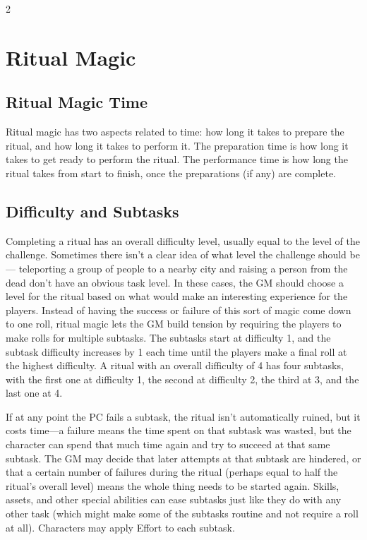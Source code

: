 \begin{multicols}{2}

\chapter{Ritual Magic}

\section{Ritual Magic Time}

Ritual magic has two aspects related to time: how long it takes to prepare the ritual, and how long it takes to perform it. The preparation time is how long it takes to get ready to perform the ritual. The performance time is how long the ritual takes from start to finish, once the preparations (if any) are complete. 

\section{Difficulty and Subtasks}

Completing a ritual has an overall difficulty level, usually equal to the level of the challenge. Sometimes there isn’t a clear idea of what level the challenge should be— teleporting a group of people to a nearby city and raising a person from the dead don’t have an obvious task level. In these cases, the GM should choose a level for the ritual based on what would make an interesting experience for the players. Instead of having the success or failure of this sort of magic come down to one roll, ritual magic lets the GM build tension by requiring the players to make rolls for multiple subtasks. The subtasks start at difficulty 1, and the subtask difficulty increases by 1 each time until the players make a final roll at the highest difficulty. A ritual with an overall difficulty of 4 has four subtasks, with the first one at difficulty 1, the second at difficulty 2, the third at 3, and the last one at 4. 

If at any point the PC fails a subtask, the ritual isn’t automatically ruined, but it costs time—a failure means the time spent on that subtask was wasted, but the character can spend that much time again and try to succeed at that same subtask. The GM may decide that later attempts at that subtask are hindered, or that a certain number of failures during the ritual (perhaps equal to half the ritual’s overall level) means the whole thing needs to be started again. Skills, assets, and other special abilities can ease subtasks just like they do with any other task (which might make some of the subtasks routine and not require a roll at all). Characters may apply Effort to each subtask. 


\end{multicols}
